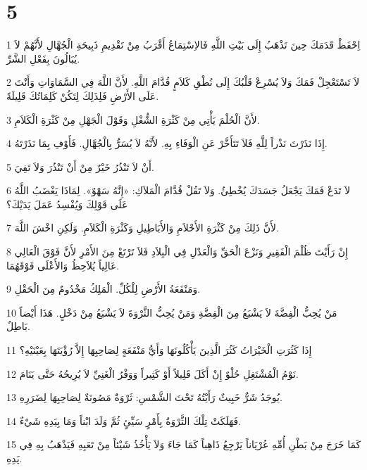 \chapter{5}

\par 1 اِحْفَظْ قَدَمَكَ حِينَ تَذْهَبُ إِلَى بَيْتِ اللَّهِ فَالاِسْتِمَاعُ أَقْرَبُ مِنْ تَقْدِيمِ ذَبِيحَةِ الْجُهَّالِ لأَنَّهُمْ لاَ يُبَالُونَ بِفَعْلِ الشَّرِّ.
\par 2 لاَ تَسْتَعْجِلْ فَمَكَ وَلاَ يُسْرِعْ قَلْبُكَ إِلَى نُطْقِ كَلاَمٍ قُدَّامَ اللَّهِ. لأَنَّ اللَّهَ فِي السَّمَاوَاتِ وَأَنْتَ عَلَى الأَرْضِ فَلِذَلِكَ لِتَكُنْ كَلِمَاتُكَ قَلِيلَةً.
\par 3 لأَنَّ الْحُلْمَ يَأْتِي مِنْ كَثْرَةِ الشُّغْلِ وَقَوْلَ الْجَهْلِ مِنْ كَثْرَةِ الْكَلاَمِ.
\par 4 إِذَا نَذَرْتَ نَذْراً لِلَّهِ فَلاَ تَتَأَخَّرْ عَنِ الْوَفَاءِ بِهِ. لأَنَّهُ لاَ يُسَرُّ بِالْجُهَّالِ. فَأَوْفِ بِمَا نَذَرْتَهُ.
\par 5 أَنْ لاَ تَنْذُرُ خَيْرٌ مِنْ أَنْ تَنْذُرَ وَلاَ تَفِيَ.
\par 6 لاَ تَدَعْ فَمَكَ يَجْعَلُ جَسَدَكَ يُخْطِئُ. وَلاَ تَقُلْ قُدَّامَ الْمَلاَكِ: «إِنَّهُ سَهْوٌ». لِمَاذَا يَغْضَبُ اللَّهُ عَلَى قَوْلِكَ وَيُفْسِدُ عَمَلَ يَدَيْكَ؟
\par 7 لأَنَّ ذَلِكَ مِنْ كَثْرَةِ الأَحْلاَمِ وَالأَبَاطِيلِ وَكَثْرَةِ الْكَلاَمِ. وَلَكِنِ اخْشَ اللَّهَ.
\par 8 إِنْ رَأَيْتَ ظُلْمَ الْفَقِيرِ وَنَزْعَ الْحَقِّ وَالْعَدْلِ فِي الْبِلاَدِ فَلاَ تَرْتَعْ مِنَ الأَمْرِ لأَنَّ فَوْقَ الْعَالِي عَالِياً يُلاَحِظُ وَالأَعْلَى فَوْقَهُمَا.
\par 9 وَمَنْفَعَةُ الأَرْضِ لِلْكُلِّ. الْمَلِكُ مَخْدُومٌ مِنَ الْحَقْلِ.
\par 10 مَنْ يُحِبُّ الْفِضَّةَ لاَ يَشْبَعُ مِنَ الْفِضَّةِ وَمَنْ يُحِبُّ الثَّرْوَةَ لاَ يَشْبَعُ مِنْ دَخْلٍ. هَذَا أَيْضاً بَاطِلٌ.
\par 11 إِذَا كَثُرَتِ الْخَيْرَاتُ كَثُرَ الَّذِينَ يَأْكُلُونَهَا وَأَيُّ مَنْفَعَةٍ لِصَاحِبِهَا إِلاَّ رُؤْيَتَهَا بِعَيْنَيْهِ؟
\par 12 نَوْمُ الْمُشْتَغِلِ حُلْوٌ إِنْ أَكَلَ قَلِيلاً أَوْ كَثِيراً وَوَفْرُ الْغَنِيِّ لاَ يُرِيحُهُ حَتَّى يَنَامَ.
\par 13 يُوجَدُ شَرٌّ خَبِيثٌ رَأَيْتُهُ تَحْتَ الشَّمْسِ: ثَرْوَةٌ مَصُونَةٌ لِصَاحِبِهَا لِضَرَرِهِ.
\par 14 فَهَلَكَتْ تِلْكَ الثَّرْوَةُ بِأَمْرٍ سَيِّئٍ ثُمَّ وَلَدَ ابْناً وَمَا بِيَدِهِ شَيْءٌ.
\par 15 كَمَا خَرَجَ مِنْ بَطْنِ أُمِّهِ عُرْيَاناً يَرْجِعُ ذَاهِباً كَمَا جَاءَ وَلاَ يَأْخُذُ شَيْئاً مِنْ تَعَبِهِ فَيَذْهَبُ بِهِ فِي يَدِهِ.
